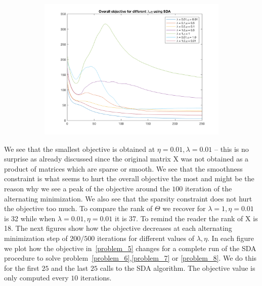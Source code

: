 \documentclass{article}
\newcommand{\0}{\mathrm{0}}
\newcommand{\1}{\mathrm{1}}
\newcommand{\X}{\mathrm{X}}
\begin{document}
\begin{center}
\begin{figure}[H]
  \begin{subfigure}[b]{0.3\textwidth}
    \includegraphics[scale=0.3]{SDA_overall}
  \end{subfigure}
\end{figure}
\end{center}
We see that the smallest objective is obtained at $\eta= 0.01,\lambda= 0.01$ -- this is no surprise as already discussed since the original matrix $\X$ was not obtained as a product of matrices which are sparse or smooth. We see that the smoothness constraint is what seems to hurt the overall objective the most and might be the reason why we see a peak of the objective around the $100$ iteration of the alternating minimization. We also see that the sparsity constraint does not hurt the objective too much. To compare the rank of $\Theta$ we recover for $\lambda = 1,\eta = 0.01$ is 32 while when $\lambda = 0.01,\eta = 0.01$ it is 37. To remind the reader the rank of $\X$ is 18. The next figures show how the objective decreases at each alternating minimization step of $200/500$ iterations for different values of $\lambda,\eta$. In each figure we plot how the objective in~\ref{problem_5} changes for a complete run of the SDA procedure to solve problem~\ref{problem_6},\ref{problem_7} or \ref{problem_8}. We do this for the first $25$ and the last $25$ calls to the SDA algorithm. The objective value is only computed every $10$ iterations.
\end{document}
